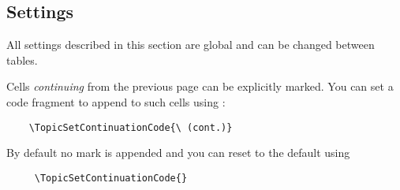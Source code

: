 \documentclass[full,kernel]{l3doc}
\begin{document}
\begin{documentation}
\subsection*{Settings}

All settings described in this section are global and can be changed between tables.

\begin{function}{\TopicSetContinuationCode}
  \begin{syntax}
  \end{syntax}
  Cells \emph{continuing} from the previous page can be explicitly
  marked.  You can set a code fragment to append to such cells using
  :
  \begin{verbatim}
    \TopicSetContinuationCode{\ (cont.)}
  \end{verbatim}
  By default no mark is appended and you can reset to the default
  using
  \begin{verbatim}
     \TopicSetContinuationCode{}
  \end{verbatim}
\end{function}\smallskip


\end{documentation}
\end{document}
